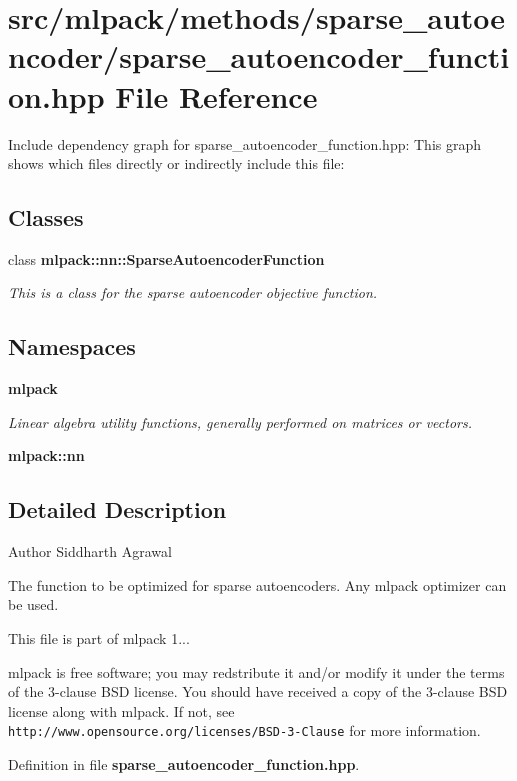 \section{src/mlpack/methods/sparse\-\_\-autoencoder/sparse\-\_\-autoencoder\-\_\-function.hpp File Reference}
\label{sparse__autoencoder__function_8hpp}
Include dependency graph for sparse\-\_\-autoencoder\-\_\-function.\-hpp\-:
This graph shows which files directly or indirectly include this file\-:
\subsection*{Classes}
\begin{DoxyCompactItemize}
\item 
class {\bf mlpack\-::nn\-::\-Sparse\-Autoencoder\-Function}
\begin{DoxyCompactList}\small\item\em This is a class for the sparse autoencoder objective function. \end{DoxyCompactList}\end{DoxyCompactItemize}
\subsection*{Namespaces}
\begin{DoxyCompactItemize}
\item 
{\bf mlpack}
\begin{DoxyCompactList}\small\item\em Linear algebra utility functions, generally performed on matrices or vectors. \end{DoxyCompactList}\item 
{\bf mlpack\-::nn}
\end{DoxyCompactItemize}


\subsection{Detailed Description}
\begin{DoxyAuthor}{Author}
Siddharth Agrawal
\end{DoxyAuthor}
The function to be optimized for sparse autoencoders. Any mlpack optimizer can be used.

This file is part of mlpack 1...

mlpack is free software; you may redstribute it and/or modify it under the terms of the 3-\/clause B\-S\-D license. You should have received a copy of the 3-\/clause B\-S\-D license along with mlpack. If not, see {\tt http\-://www.\-opensource.\-org/licenses/\-B\-S\-D-\/3-\/\-Clause} for more information. 

Definition in file {\bf sparse\-\_\-autoencoder\-\_\-function.\-hpp}.

